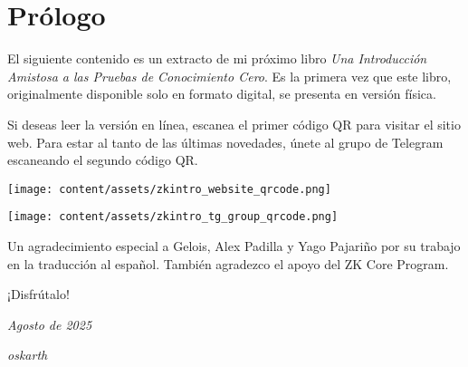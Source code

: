 \section*{Prólogo}
\vspace{0.5cm}

El siguiente contenido es un extracto de mi próximo libro \textit{Una Introducción Amistosa a las Pruebas de Conocimiento Cero}.
Es la primera vez que este libro, originalmente disponible solo en formato digital, se presenta en versión física.

Si deseas leer la versión en línea, escanea el primer código QR para visitar el sitio web.
Para estar al tanto de las últimas novedades, únete al grupo de Telegram escaneando el segundo código QR.

\vspace{0.25cm}
\begin{center}
\texttt{[image: content/assets/zkintro\_website\_qrcode.png]}
\end{center}
\vspace{0.2cm}
\begin{center}
\texttt{[image: content/assets/zkintro\_tg\_group\_qrcode.png]}
\end{center}
\vspace{0.2cm}

Un agradecimiento especial a Gelois, Alex Padilla y Yago Pajariño por su trabajo en la traducción al español.
También agradezco el apoyo del ZK Core Program.

\vspace{0.5cm}
¡Disfrútalo!

\textit{Agosto de 2025}

\textit{oskarth}

\thispagestyle{empty}
